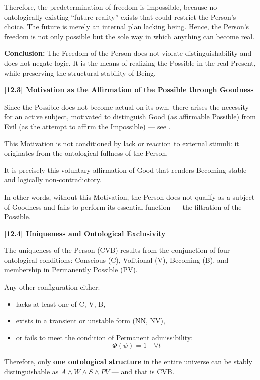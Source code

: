 \documentclass[12pt]{article}
\begin{document}
Therefore, the predetermination of freedom is impossible, because no ontologically existing ``future reality'' exists that could restrict the Person’s choice. The future is merely an internal plan lacking being. Hence, the Person’s freedom is not only possible but the sole way in which anything can become real.

\textbf{Conclusion:}
The Freedom of the Person does not violate distinguishability and does not negate logic. It is the means of realizing the Possible in the real Present, while preserving the structural stability of Being.


\textbf{[12.3] Motivation as the Affirmation of the Possible through Goodness}

Since the Possible does not become actual on its own, there arises the necessity for an active subject, motivated to distinguish Good (as affirmable Possible) from Evil (as the attempt to affirm the Impossible) — see \text{[11.3]}.

This Motivation is not conditioned by lack or reaction to external stimuli: it originates from the ontological fullness of the Person.

It is precisely this voluntary affirmation of Good that renders Becoming stable and logically non-contradictory.

In other words, without this Motivation, the Person does not qualify as a subject of Goodness and fails to perform its essential function — the filtration of the Possible.


\textbf{[12.4] Uniqueness and Ontological Exclusivity}   

The uniqueness of the Person (CVB) results from the conjunction of four ontological conditions:
Conscious (C), Volitional (V), Becoming (B), and membership in Permanently Possible (PV).

Any other configuration either:

\begin{itemize}
\item lacks at least one of C, V, B,
\item exists in a transient or unstable form (NN, NV),
\item or fails to meet the condition of Permanent admissibility:
\[
\Phi(\psi) = 1 \quad \forall t
\]
\end{itemize}

Therefore, only \textbf{one ontological structure} in the entire universe can be stably distinguishable as $A \land W \land S \land PV$ — and that is CVB.
\end{document}
